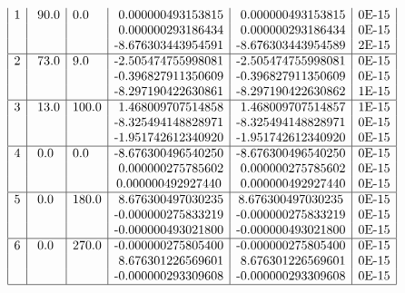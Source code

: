 \begin{description}
\begin{table}
\[\begin{array}{| c | l | l | c | c | c |}
\mbox{1} & \mbox{ 90.0} & \mbox{0.0} & \mbox{ 0.000000493153815}  & \mbox{ 0.000000493153815}  & \mbox{0E-15}\\
\mbox{ } & \mbox{     } & \mbox{   } & \mbox{ 0.000000293186434}  & \mbox{ 0.000000293186434}  & \mbox{0E-15}\\
\mbox{ } & \mbox{     } & \mbox{   } & \mbox{-8.676303443954591}  & \mbox{-8.676303443954589}  & \mbox{2E-15}\\
\hline

\mbox{2} & \mbox{ 73.0} & \mbox{9.0} & \mbox{-2.505474755998081} & \mbox{-2.505474755998081} & \mbox{0E-15}\\
\mbox{ } & \mbox{     } & \mbox{   } & \mbox{-0.396827911350609} & \mbox{-0.396827911350609} & \mbox{0E-15}\\
\mbox{ } & \mbox{     } & \mbox{   } & \mbox{-8.297190422630861} & \mbox{-8.297190422630862} & \mbox{1E-15}\\
\hline

\mbox{3} & \mbox{ 13.0} & \mbox{100.0} & \mbox{ 1.468009707514858} & \mbox{ 1.468009707514857} & \mbox{1E-15}\\
\mbox{ } & \mbox{     } & \mbox{   }   & \mbox{-8.325494148828971} & \mbox{-8.325494148828971} & \mbox{0E-15}\\
\mbox{ } & \mbox{     } & \mbox{   }   & \mbox{-1.951742612340920} & \mbox{-1.951742612340920} & \mbox{0E-15}\\
\hline

\mbox{4} & \mbox{  0.0} & \mbox{0.0} & \mbox{-8.676300496540250} & \mbox{-8.676300496540250} & \mbox{0E-15}\\
\mbox{ } & \mbox{     } & \mbox{   } & \mbox{ 0.000000275785602} & \mbox{ 0.000000275785602} & \mbox{0E-15}\\
\mbox{ } & \mbox{     } & \mbox{   } & \mbox {0.000000492927440} & \mbox{ 0.000000492927440} & \mbox{0E-15}\\
\hline

\mbox{5} & \mbox{  0.0} & \mbox{180.0} & \mbox{ 8.676300497030235} & \mbox {8.676300497030235} & \mbox{0E-15}\\
\mbox{ } & \mbox{     } & \mbox{   }   & \mbox{-0.000000275833219} & \mbox{-0.000000275833219} & \mbox{0E-15}\\
\mbox{ } & \mbox{     } & \mbox{   }   & \mbox{-0.000000493021800} & \mbox{-0.000000493021800} & \mbox{0E-15}\\
\hline

\mbox{6} & \mbox{  0.0} & \mbox{270.0} & \mbox{-0.000000275805400} & \mbox{-0.000000275805400} & \mbox{0E-15}\\
\mbox{ } & \mbox{     } & \mbox{   }   & \mbox{ 8.676301226569601} & \mbox{ 8.676301226569601} & \mbox{0E-15}\\
\mbox{ } & \mbox{     } & \mbox{   }   & \mbox{-0.000000293309608} & \mbox{-0.000000293309608} & \mbox{0E-15}\\
\hline


\end{array}\]
\end{table}
\end{description}
